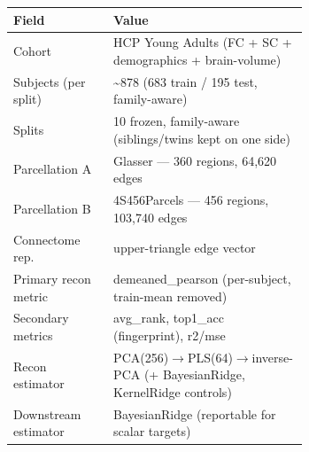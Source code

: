\begin{tabular}{@{}l p{0.66\linewidth}@{}}
\toprule
\textbf{Field} & \textbf{Value} \\
\midrule
Cohort & HCP Young Adults (FC + SC + demographics + brain-volume) \\
Subjects (per split) & \textasciitilde{}878 (683 train / 195 test, family-aware) \\
Splits & 10 frozen, family-aware (siblings/twins kept on one side) \\
Parcellation A & Glasser --- 360 regions, 64,620 edges \\
Parcellation B & 4S456Parcels --- 456 regions, 103,740 edges \\
Connectome rep. & upper-triangle edge vector \\
Primary recon metric & demeaned\_pearson (per-subject, train-mean removed) \\
Secondary metrics & avg\_rank, top1\_acc (fingerprint), r2/mse \\
Recon estimator & PCA(256)$\rightarrow$PLS(64)$\rightarrow$inverse-PCA (+ BayesianRidge, KernelRidge controls) \\
Downstream estimator & BayesianRidge (reportable for scalar targets) \\
\bottomrule
\end{tabular}